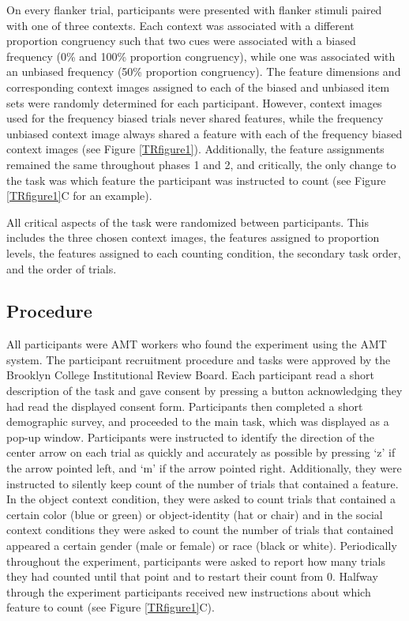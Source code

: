 \documentclass[]{DissertateCUNY}
\begin{document}
On every flanker trial, participants were presented with flanker stimuli
paired with one of three contexts. Each context was associated with a
different proportion congruency such that two cues were associated with
a biased frequency (0\% and 100\% proportion congruency), while one was
associated with an unbiased frequency (50\% proportion congruency). The
feature dimensions and corresponding context images assigned to each of
the biased and unbiased item sets were randomly determined for each
participant. However, context images used for the frequency biased
trials never shared features, while the frequency unbiased context image
always shared a feature with each of the frequency biased context images
(see Figure \ref{TRfigure1}). Additionally, the feature assignments
remained the same throughout phases 1 and 2, and critically, the only
change to the task was which feature the participant was instructed to
count (see Figure \ref{TRfigure1}C for an example).

All critical aspects of the task were randomized between participants.
This includes the three chosen context images, the features assigned to
proportion levels, the features assigned to each counting condition, the
secondary task order, and the order of trials.

\hypertarget{procedure-4}{%
\subsection{Procedure}\label{procedure-4}}

All participants were AMT workers who found the experiment using the AMT
system. The participant recruitment procedure and tasks were approved by
the Brooklyn College Institutional Review Board. Each participant read a
short description of the task and gave consent by pressing a button
acknowledging they had read the displayed consent form. Participants
then completed a short demographic survey, and proceeded to the main
task, which was displayed as a pop-up window. Participants were
instructed to identify the direction of the center arrow on each trial
as quickly and accurately as possible by pressing `z' if the arrow
pointed left, and `m' if the arrow pointed right. Additionally, they
were instructed to silently keep count of the number of trials that
contained a feature. In the object context condition, they were asked to
count trials that contained a certain color (blue or green) or
object-identity (hat or chair) and in the social context conditions they
were asked to count the number of trials that contained appeared a
certain gender (male or female) or race (black or white). Periodically
throughout the experiment, participants were asked to report how many
trials they had counted until that point and to restart their count from
0. Halfway through the experiment participants received new instructions
about which feature to count (see Figure \ref{TRfigure1}C).
\end{document}
